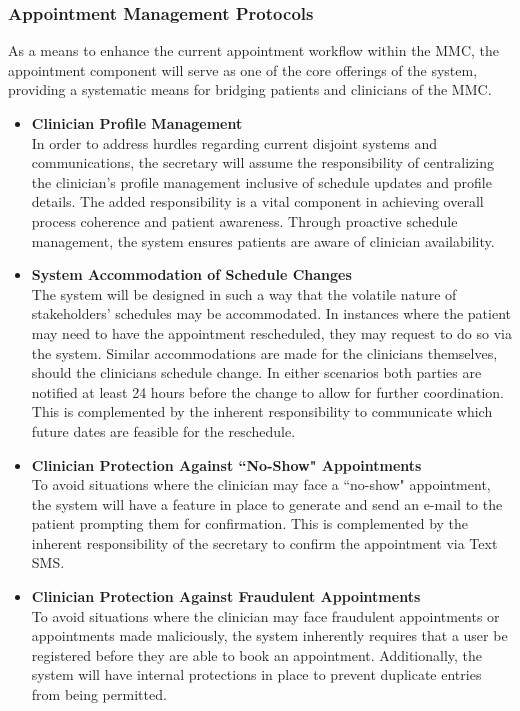 \documentclass[11pt,a4paper,titlepage]{article}
\begin{document}
	\subsubsection{Appointment Management Protocols}
	As a means to enhance the current appointment workflow within the MMC, the appointment component will serve as one of the core offerings of the system, providing a systematic means for bridging patients and clinicians of the MMC.
	\begin{itemize}
		\item \textbf{Clinician Profile Management} \\
		In order to address hurdles regarding current disjoint systems and communications, the secretary will assume the responsibility of centralizing the clinician's profile management inclusive of schedule updates and profile details. The added responsibility is a vital component in achieving overall process coherence and patient awareness. Through proactive schedule management, the system ensures patients are aware of clinician availability.\\
		\item \textbf{System Accommodation of Schedule Changes} \\
		The system will be designed in such a way that the volatile nature of stakeholders' schedules may be accommodated. In instances where the patient may need to have the appointment rescheduled, they may request to do so via the system. Similar accommodations are made for the clinicians themselves, should the clinicians schedule change. In either scenarios both parties are notified at least 24 hours before the change to allow for further coordination. This is complemented by the inherent responsibility to communicate which future dates are feasible for the reschedule.
		\item \textbf{Clinician Protection Against ``No-Show" Appointments} \\
		To avoid situations where the clinician may face a ``no-show" appointment, the system will have a feature in place to generate and send an e-mail to the patient prompting them for confirmation. This is complemented by the inherent responsibility of the secretary to confirm the appointment via Text SMS. 
		\item \textbf{Clinician Protection Against Fraudulent Appointments} \\
		To avoid situations where the clinician may face fraudulent appointments or appointments made maliciously, the system inherently requires that a user be registered before they are able to book an appointment. Additionally, the system will have internal protections in place to prevent duplicate entries from being permitted.
	\end{itemize}
	
\end{document}
